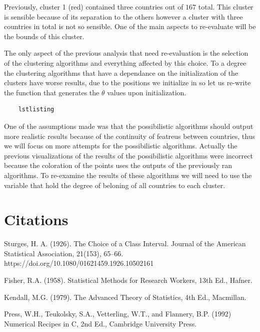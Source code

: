 \documentclass[12pt, a4paper]{article}
\begin{document}
Previously, cluster 1 (red) contained three countries out of $167$ total. This cluster is sensible because of its separation to the others however a cluster with three countries in total is not so sensible. One of the main aspects to re-evaluate will be the bounds of this cluster.
\newline

The only aspect of the previous analysis that need re-evaluation is the selection of the clustering algorithms and everything affected by this choice. To a degree the clustering algorithms that have a dependance on the initialization of the clusters have worse results, due to the positions we initialize in so let us re-write the function that generates the $\theta$ values upon initialization.

\begin{lstlisting}
    lstlisting
\end{lstlisting}

One of the assumptions made was that the possibilistic algorithms should output more realistic results because of the continuity of featreus between countries, thus we will focus on more attempts for the possibilistic algorithms. Actually the previous visualizations of the results of the possibilistic algorithms were incorrect because the coloration of the points uses the outputs of the previously ran algorithms. To re-examine the results of these algorithms we will need to use the variable that hold the degree of beloning of all countries to each cluster.

\section{Citations}

Sturges, H. A. (1926). The Choice of a Class Interval. Journal of the American Statistical Association, 21(153), 65–66. https://doi.org/10.1080/01621459.1926.10502161
\newline

Fisher, R.A. (1958). Statistical Methods for Research Workers, 13th Ed., Hafner. 
\newline

Kendall, M.G. (1979). The Advanced Theory of Statistics, 4th Ed., Macmillan.
\newline

Press, W.H., Teukolsky, S.A., Vetterling, W.T., and Flannery, B.P. (1992) Numerical Recipes in C, 2nd Ed., Cambridge University Press.
\end{document}
